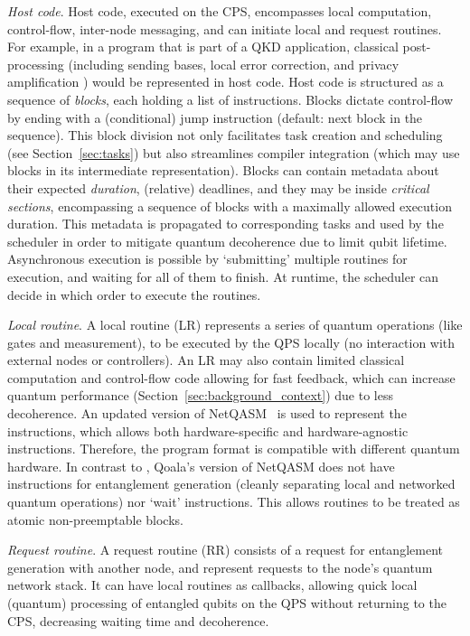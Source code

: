 \textit{Host code}.
Host code, executed on the CPS, encompasses local computation, control-flow, inter-node messaging, and can initiate local and request routines.
For example, in a program that is part of a QKD application, classical post-processing (including sending bases, local error correction, and privacy amplification \cite{vidick2023introduction}) would be represented in host code.
Host code is structured as a sequence of \textit{blocks}, each holding a list of instructions.
Blocks dictate control-flow by ending with a (conditional) jump instruction (default: next block in the sequence).
This block division not only facilitates task creation and scheduling (see Section~\ref{sec:tasks}) but also streamlines compiler integration (which may use blocks in its intermediate representation).
Blocks can contain metadata about their expected \textit{duration}, (relative) deadlines, and they may be inside \textit{critical sections}, encompassing a sequence of blocks with a maximally allowed execution duration. This metadata is propagated to corresponding tasks and used by the scheduler in order to mitigate quantum decoherence due to limit qubit lifetime.
Asynchronous execution is possible by `submitting' multiple routines for execution, and waiting for all of them to finish. At runtime, the scheduler can decide in which order to execute the routines.


\textit{Local routine}.
A local routine (LR) represents a series of quantum operations (like gates and measurement), to be executed by the QPS locally (no interaction with external nodes or controllers).
An LR may also contain limited classical computation and control-flow code allowing for fast feedback, which can increase quantum performance (Section~\ref{sec:background_context}) due to less decoherence.
An updated version of NetQASM~\cite{dahlberg2022netqasm} is used to represent the instructions, which allows both hardware-specific and hardware-agnostic instructions.
Therefore, the program format is compatible with different quantum hardware.
In contrast to \cite{dahlberg2022netqasm}, Qoala's version of NetQASM does not have instructions for entanglement generation (cleanly separating local and networked quantum operations)
nor `wait' instructions. This allows routines to be treated as atomic non-preemptable blocks.

\textit{Request routine}. A request routine (RR) consists of a request for entanglement generation with another node, and represent requests to the node's quantum network stack.
It can have local routines as callbacks, allowing quick local (quantum) processing of entangled qubits on the QPS without returning to the CPS, decreasing waiting time and decoherence.


